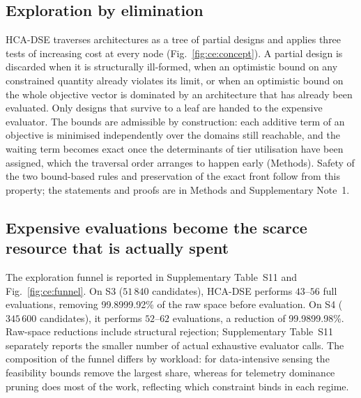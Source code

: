\documentclass[pdflatex,sn-nature,lineno]{sn-jnl}
\newcommand{\SthreeEvalRange}{43\text{--}56}
\newcommand{\SfourEvalRange}{52\text{--}62}
\newcommand{\RefFunnelSite}{Supplementary Table~S11 and Fig.~\ref{fig:ce:funnel}}
\newcommand{\RefFunnelTab}{Supplementary Table~S11}
\begin{document}
\subsection{Exploration by elimination}
HCA-DSE traverses architectures as a tree of partial designs and applies three tests of
increasing cost at every node (Fig.~\ref{fig:ce:concept}). A partial design is discarded
when it is structurally ill-formed, when an optimistic bound on any constrained quantity
already violates its limit, or when an optimistic bound on the whole objective vector is
dominated by an architecture that has already been evaluated. Only designs that survive
to a leaf are handed to the expensive evaluator. The bounds are admissible by
construction: each additive term of an objective is minimised independently over the
domains still reachable, and the waiting term becomes exact once the determinants of tier
utilisation have been assigned, which the traversal order arranges to happen early
(Methods). Safety of the two bound-based rules and preservation of the exact front follow
from this property; the statements and proofs are in Methods and Supplementary Note~1.

\subsection{Expensive evaluations become the scarce resource that is actually spent}
%
The exploration funnel is reported in \RefFunnelSite{}. On S3 ($51\,840$ candidates), HCA-DSE performs $\SthreeEvalRange$ full evaluations, removing 99.89\text{--}99.92\% of the raw space before evaluation. On S4 ($345\,600$ candidates), it performs $\SfourEvalRange$ evaluations, a reduction of 99.98\text{--}99.98\%. Raw-space reductions include structural rejection; \RefFunnelTab{} separately reports the smaller number of actual exhaustive evaluator calls.
The composition of the funnel differs by workload: for data-intensive sensing the
feasibility bounds remove the largest share, whereas for telemetry dominance pruning does
most of the work, reflecting which constraint binds in each regime.
\end{document}
